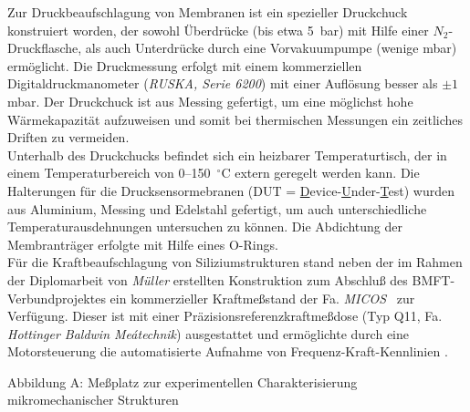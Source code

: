 Zur Druckbeaufschlagung von Membranen ist ein spezieller Druckchuck
konstruiert worden, der sowohl Überdrücke (bis etwa 5~bar) mit Hilfe einer
$N_{2}$-Druckflasche, als auch Unterdrücke durch eine Vorvakuumpumpe
(wenige mbar) ermöglicht. Die Druckmessung erfolgt mit einem
kommerziellen Digitaldruckmanometer ({\em RUSKA, Serie 6200}) mit einer
Auflösung besser als $\pm1$ mbar. Der Druckchuck ist aus Messing gefertigt,
um eine möglichst hohe Wärmekapazität aufzuweisen und somit bei thermischen
Messungen ein zeitliches Driften zu vermeiden. \\
Unterhalb des Druckchucks befindet sich ein heizbarer Temperaturtisch, der
in einem Temperaturbereich von 0--150~$^\circ$C extern geregelt werden kann.
Die Halterungen für die Drucksensormebranen
(DUT = \underline{D}evice-\underline{U}nder-\underline{T}est)
wurden aus Aluminium, Messing und Edelstahl gefertigt, um auch
unterschiedliche Temperaturausdehnungen untersuchen zu können. Die
Abdichtung der Membranträger erfolgte mit Hilfe eines O-Rings.\\
%
Für die Kraftbeaufschlagung von Siliziumstrukturen stand neben der
im Rahmen der Diplomarbeit von {\sl Müller} erstellten Konstruktion
\cite{Mue92} zum Abschluß des BMFT-Verbundprojektes ein kommerzieller
Kraftmeßstand der Fa. {\em MICOS} \, zur Verfügung. Dieser ist mit einer
Präzisionsreferenzkraftmeßdose (Typ Q11, Fa. {\em Hottinger Baldwin
Meátechnik}) ausgestattet und ermöglichte durch eine Motorsteuerung die
automatisierte Aufnahme von Frequenz-Kraft-Kennlinien \cite{Wag94}.

\newpage

Abbildung A: Meßplatz zur experimentellen Charakterisierung
mikromechanischer Strukturen\\

